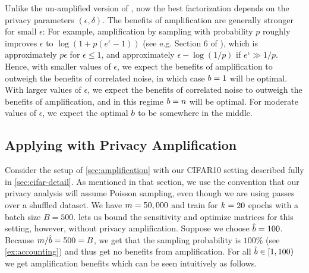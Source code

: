 \documentclass{article}
\begin{document}
Unlike the un-amplified version of \MF, now the best factorization depends on the privacy parameters $(\epsilon, \delta)$. The benefits of amplification are generally stronger for small $\epsilon$: For example, amplification by sampling with probability $p$ roughly improves $\epsilon$ to $\log(1 + p(e^\epsilon - 1))$ (see e.g. Section 6 of \cite{steinke2022composition}), which is approximately $p\epsilon$ for $\epsilon \leq 1$, and approximately $\epsilon - \log(1/p)$ if $e^\epsilon \gg 1/p$. Hence, with smaller values of $\epsilon$, we expect the benefits of amplification to outweigh the benefits of correlated noise, in which case $b=1$ will be optimal. With larger values of $\epsilon$, we expect the benefits of correlated noise to outweigh the benefits of amplification, and in this regime $b=n$ will be optimal. For moderate values of $\epsilon$, we expect the optimal $b$ to be somewhere in the middle.

\subsection{Applying \BANDMF with Privacy Amplification}\label{sec:amplification-example}
Consider the setup of \cref{sec:amplification} with our CIFAR10 setting described fully in \cref{sec:cifar-detail}. As mentioned in that section, we use the convention that our privacy analysis will assume Poisson sampling, even though we are using passes over a shuffled dataset. We have $m=50,000$ and train for $k=20$ epochs with a batch size $B=500$. \citet{choquette2022multi} lets us bound the sensitivity and optimize matrices for this setting, however, without privacy amplification. Suppose we choose $\hat{b}=100$. Because $m/\hat{b}=500=B$, we get that the sampling probability is $100\%$ (see \cref{ex:accounting}) and thus get no benefits from amplification. For all $\hat{b}\in[1,100)$ we get amplification benefits which can be seen intuitively as follows.
\end{document}
